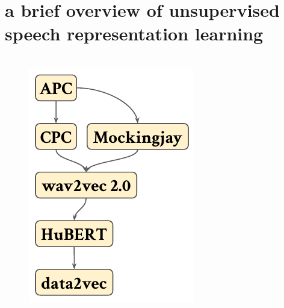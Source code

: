 
\section{a brief overview of unsupervised speech representation learning}


\begin{frame}
    \frametitle{\vphantom{ABCDEFGHJIJKLMNOPQRSTVWXYZ}{Development of SSL for speech}}
    \begin{columns}[t]
        \hspace{0.025\textwidth}
        \begin{column}{0.20\textwidth}
            \begin{figure}[\textwidth]
                \centering
                \includegraphics[width=\textwidth]{figures/brief-flow-0.pdf}

\end{figure}
\end{column}
\end{columns}
\end{frame}
